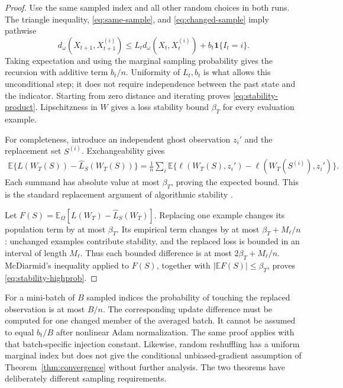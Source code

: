 \begin{proof}
Use the same sampled index and all other random choices in both runs.
The triangle inequality, \eqref{eq:same-sample}, and
\eqref{eq:changed-sample} imply pathwise
\begin{equation}
 d_\omega(X_{t+1},X_{t+1}^{(i)})
 \le L_t d_\omega(X_t,X_t^{(i)})
           +b_t\mathbf1\{I_t=i\}.
\end{equation}
Taking expectation and using the marginal sampling probability gives the
recursion with additive term $b_t/n$. Uniformity of $L_t,b_t$ is what
allows this unconditional step; it does not require independence between
the past state and the indicator. Starting from zero distance and iterating
proves \eqref{eq:stability-product}. Lipschitzness in $W$ gives a loss
stability bound $\beta_T$ for every evaluation example.

For completeness, introduce an independent ghost observation $z_i'$ and
the replacement set $S^{(i)}$. Exchangeability gives
\begin{align}
 \mathbb E\{L(W_T(S))-\widehat L_S(W_T(S))\}
 =\frac1n\sum_i\mathbb E\{
 \ell(W_T(S),z_i')-\ell(W_T(S^{(i)}),z_i')\}.
\end{align}
Each summand has absolute value at most $\beta_T$, proving the expected
bound. This is the standard replacement argument of algorithmic stability
\cite{bousquet2002stability,hardt2016stability}.

Let $F(S)=\mathbb E_\Omega[L(W_T)-\widehat L_S(W_T)]$.
Replacing one example changes its population term by at most $\beta_T$.
Its empirical term changes by at most $\beta_T+M_\ell/n$: unchanged
examples contribute stability, and the replaced loss is bounded in an
interval of length $M_\ell$. Thus each bounded difference is at most
$2\beta_T+M_\ell/n$. McDiarmid's inequality applied to $F(S)$, together
with $|\mathbb EF(S)|\le\beta_T$, proves
\eqref{eq:stability-highprob}.
\end{proof}

For a mini-batch of $B$ sampled indices the probability of touching the
replaced observation is at most $B/n$. The corresponding update difference
must be computed for one changed member of the averaged batch. It cannot
be assumed to equal $b_t/B$ after nonlinear Adam normalization. The same
proof applies with that batch-specific injection constant. Likewise,
random reshuffling has a uniform marginal index but does not give the
conditional unbiased-gradient assumption of
Theorem~\ref{thm:convergence} without further analysis. The two theorems
have deliberately different sampling requirements.

